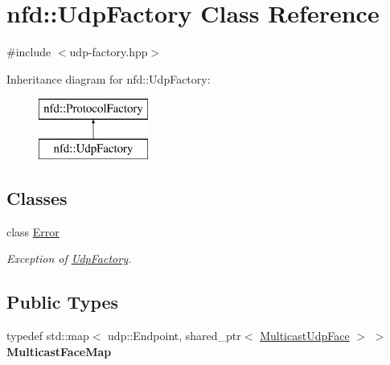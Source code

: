 \hypertarget{classnfd_1_1UdpFactory}{}\section{nfd\+:\+:Udp\+Factory Class Reference}
\label{classnfd_1_1UdpFactory}


{\ttfamily \#include $<$udp-\/factory.\+hpp$>$}

Inheritance diagram for nfd\+:\+:Udp\+Factory\+:\begin{figure}[H]
\begin{center}
\leavevmode
\includegraphics[height=2.000000cm]{classnfd_1_1UdpFactory}
\end{center}
\end{figure}
\subsection*{Classes}
\begin{DoxyCompactItemize}
\item 
class \hyperlink{classnfd_1_1UdpFactory_1_1Error}{Error}
\begin{DoxyCompactList}\small\item\em Exception of \hyperlink{classnfd_1_1UdpFactory}{Udp\+Factory}. \end{DoxyCompactList}\end{DoxyCompactItemize}
\subsection*{Public Types}
\begin{DoxyCompactItemize}
\item 
typedef std\+::map$<$ udp\+::\+Endpoint, shared\+\_\+ptr$<$ \hyperlink{classnfd_1_1MulticastUdpFace}{Multicast\+Udp\+Face} $>$ $>$ {\bfseries Multicast\+Face\+Map}\hypertarget{classnfd_1_1UdpFactory_a136ee547c94b84a9ca5f3cd0afc2f89b}{}\label{classnfd_1_1UdpFactory_a136ee547c94b84a9ca5f3cd0afc2f89b}

\end{DoxyCompactItemize}
